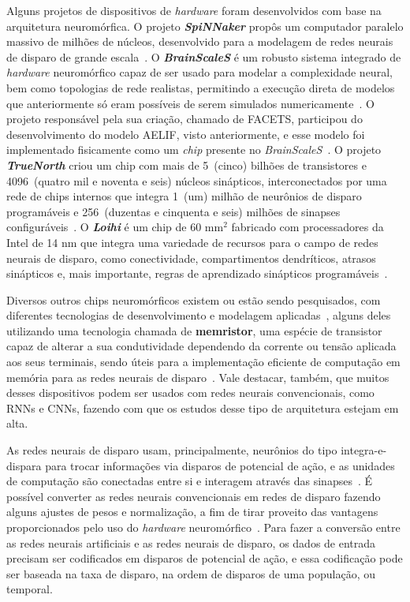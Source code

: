 Alguns projetos de dispositivos de \textit{hardware} foram desenvolvidos com base na arquitetura neuromórfica. O projeto \textbf{\textit{SpiNNaker}} propôs um computador paralelo massivo de milhões de núcleos, desenvolvido para a modelagem de redes neurais de disparo de grande escala~\cite{furber_spinnaker_2014}. O \textbf{\textit{BrainScaleS}} é um robusto sistema integrado de \textit{hardware} neuromórfico capaz de ser usado para modelar a complexidade neural, bem como topologias de rede realistas, permitindo a execução direta de modelos que anteriormente só eram possíveis de serem simulados numericamente~\cite{schemmel_wafer-scale_2010}. O projeto responsável pela sua criação, chamado de FACETS, participou do desenvolvimento do modelo AELIF, visto anteriormente, e esse modelo foi implementado fisicamente como um \textit{chip} presente no \textit{BrainScaleS}~\cite{aamir_lif_2017}. O projeto \textbf{\textit{TrueNorth}} criou um chip com mais de 5~(cinco) bilhões de transistores e 4096~(quatro mil e noventa e seis) núcleos sinápticos, interconectados por uma rede de chips internos que integra 1~(um) milhão de neurônios de disparo programáveis e 256~(duzentas e cinquenta e seis) milhões de sinapses configuráveis~\cite{merolla_million_2014}. O \textbf{\textit{Loihi}} é um chip de 60 $\text{mm}^2$ fabricado com processadores da Intel de 14 nm que integra uma variedade de recursos para o campo de redes neurais de disparo, como conectividade, compartimentos dendríticos, atrasos sinápticos e, mais importante, regras de aprendizado sinápticos programáveis~\cite{davies_loihi_2018}.

Diversos outros chips neuromórficos existem ou estão sendo pesquisados, com diferentes tecnologias de desenvolvimento e modelagem aplicadas~\cite{mehonic_brain-inspired_2022}, 
alguns deles utilizando uma tecnologia chamada de \textbf{memristor}, uma espécie de transistor capaz de alterar a sua condutividade dependendo da corrente ou tensão aplicada aos seus terminais, sendo úteis para a implementação eficiente de computação em memória para as redes neurais de disparo~\cite{mehonic_memristorsmemory_2020}. Vale destacar, também, que muitos desses dispositivos podem ser usados com redes neurais convencionais, como RNNs e CNNs, fazendo com que os estudos desse tipo de arquitetura estejam em alta.

As redes neurais de disparo usam, principalmente, neurônios do tipo integra-e-dispara para trocar informações via disparos de potencial de ação, e as unidades de computação são conectadas entre si e interagem através das sinapses~\cite{roy_towards_2019}. É possível converter as redes neurais convencionais em redes de disparo fazendo alguns ajustes de pesos e normalização, a fim de tirar proveito das vantagens proporcionados pelo uso do \textit{hardware} neuromórfico~\cite{diehl_conversion_2016}. Para fazer a conversão entre as redes neurais artificiais e as redes neurais de disparo, os dados de entrada precisam ser codificados em disparos de potencial de ação, e essa codificação pode ser baseada na taxa de disparo, na ordem de disparos de uma população, ou temporal.

